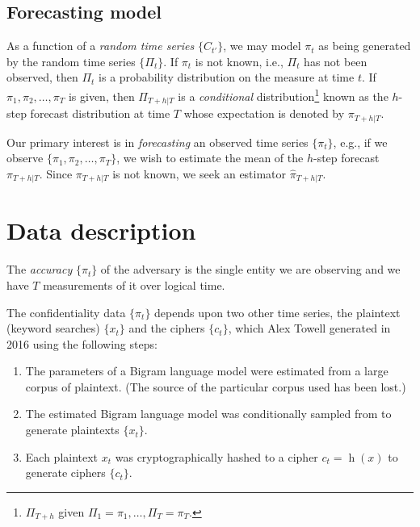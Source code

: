 \documentclass[final,
  11pt,
]{article}
\begin{document}
\hypertarget{forecasting-model}{%
\subsection{Forecasting model}\label{forecasting-model}}

As a function of a \emph{random time series} \(\{C_{t'}\}\), we may
model \(\pi_t\) as being generated by the random time series
\(\{\Pi_t\}\). If \(\pi_{t}\) is not known, i.e., \(\Pi_{t}\) has not
been observed, then \(\Pi_{t}\) is a probability distribution on the
measure at time \(t\). If \(\pi_{1},\pi_{2},\ldots,\pi_{T}\) is given,
then \(\Pi_{T+h|T}\) is a \emph{conditional}
distribution\footnote{$\Pi_{T+h}$ given $\Pi_1 = \pi_1,\ldots,\Pi_T = \pi_T$.}
known as the \(h\)-step forecast distribution at time \(T\) whose
expectation is denoted by \(\pi_{T+h|T}\).

Our primary interest is in \emph{forecasting} an observed time series
\(\{\pi_t\}\), e.g., if we observe \(\{\pi_1,\pi_2,\ldots,\pi_T\}\), we
wish to estimate the mean of the \(h\)-step forecast \(\pi_{T+h|T}\).
Since \(\pi_{T+h|T}\) is not known, we seek an estimator
\(\hat{\pi}_{T+h|T}\).

\hypertarget{data-description}{%
\section{Data description}\label{data-description}}

The \emph{accuracy} \(\{\pi_t\}\) of the adversary is the single entity
we are observing and we have \(T\) measurements of it over logical time.

The confidentiality data \(\{\pi_t\}\) depends upon two other time
series, the plaintext (keyword searches) \(\{x_t\}\) and the ciphers
\(\{c_t\}\), which Alex Towell generated in 2016 using the following
steps:

\begin{enumerate}
\item The parameters of a Bigram language model were estimated from a large
corpus of plaintext.
(The source of the particular corpus used has been lost.)
\item The estimated Bigram language model was conditionally sampled from to
generate plaintexts $\{x_t\}$.
\item Each plaintext $x_t$ was cryptographically hashed to a cipher
$c_t = \operatorname{h}(x)$ to generate ciphers $\{c_t\}$.
\end{enumerate}
\end{document}
